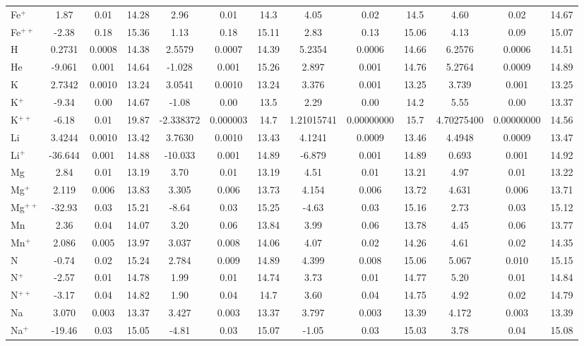 \begin{longtable}{l!{\vrule width 0.25pt}ccc!{\vrule width 0.25pt}ccc!{\vrule width 0.25pt}ccc!{\vrule width 0.25pt}ccc}
Fe$^+$ & 1.87 & 0.01 & 14.28 & 2.96 & 0.01 & 14.3 & 4.05 & 0.02 & 14.5 & 4.60 & 0.02 & 14.67 \\
Fe$^{++}$ & -2.38 & 0.18 & 15.36 & 1.13 & 0.18 & 15.11 & 2.83 & 0.13 & 15.06 & 4.13 & 0.09 & 15.07 \\
H & 0.2731 & 0.0008 & 14.38 & 2.5579 & 0.0007 & 14.39 & 5.2354 & 0.0006 & 14.66 & 6.2576 & 0.0006 & 14.51 \\
He & -9.061 & 0.001 & 14.64 & -1.028 & 0.001 & 15.26 & 2.897 & 0.001 & 14.76 & 5.2764 & 0.0009 & 14.89 \\
K & 2.7342 & 0.0010 & 13.24 & 3.0541 & 0.0010 & 13.24 & 3.376 & 0.001 & 13.25 & 3.739 & 0.001 & 13.25 \\
K$^+$ & -9.34 & 0.00 & 14.67 & -1.08 & 0.00 & 13.5 & 2.29 & 0.00 & 14.2 & 5.55 & 0.00 & 13.37 \\
K$^{++}$ & -6.18 & 0.01 & 19.87 & -2.338372 & 0.000003 & 14.7 & 1.21015741 & 0.00000000 & 15.7 & 4.70275400 & 0.00000000 & 14.56 \\
Li & 3.4244 & 0.0010 & 13.42 & 3.7630 & 0.0010 & 13.43 & 4.1241 & 0.0009 & 13.46 & 4.4948 & 0.0009 & 13.47 \\
Li$^+$ & -36.644 & 0.001 & 14.88 & -10.033 & 0.001 & 14.89 & -6.879 & 0.001 & 14.89 & 0.693 & 0.001 & 14.92 \\
Mg & 2.84 & 0.01 & 13.19 & 3.70 & 0.01 & 13.19 & 4.51 & 0.01 & 13.21 & 4.97 & 0.01 & 13.22 \\
Mg$^+$ & 2.119 & 0.006 & 13.83 & 3.305 & 0.006 & 13.73 & 4.154 & 0.006 & 13.72 & 4.631 & 0.006 & 13.71 \\
Mg$^{++}$ & -32.93 & 0.03 & 15.21 & -8.64 & 0.03 & 15.25 & -4.63 & 0.03 & 15.16 & 2.73 & 0.03 & 15.12 \\
Mn & 2.36 & 0.04 & 14.07 & 3.20 & 0.06 & 13.84 & 3.99 & 0.06 & 13.78 & 4.45 & 0.06 & 13.77 \\
Mn$^+$ & 2.086 & 0.005 & 13.97 & 3.037 & 0.008 & 14.06 & 4.07 & 0.02 & 14.26 & 4.61 & 0.02 & 14.35 \\
N & -0.74 & 0.02 & 15.24 & 2.784 & 0.009 & 14.89 & 4.399 & 0.008 & 15.06 & 5.067 & 0.010 & 15.15 \\
N$^+$ & -2.57 & 0.01 & 14.78 & 1.99 & 0.01 & 14.74 & 3.73 & 0.01 & 14.77 & 5.20 & 0.01 & 14.84 \\
N$^{++}$ & -3.17 & 0.04 & 14.82 & 1.90 & 0.04 & 14.7 & 3.60 & 0.04 & 14.75 & 4.92 & 0.02 & 14.79 \\
Na & 3.070 & 0.003 & 13.37 & 3.427 & 0.003 & 13.37 & 3.797 & 0.003 & 13.39 & 4.172 & 0.003 & 13.39 \\
Na$^+$ & -19.46 & 0.03 & 15.05 & -4.81 & 0.03 & 15.07 & -1.05 & 0.03 & 15.03 & 3.78 & 0.04 & 15.08 \\

\end{longtable}
